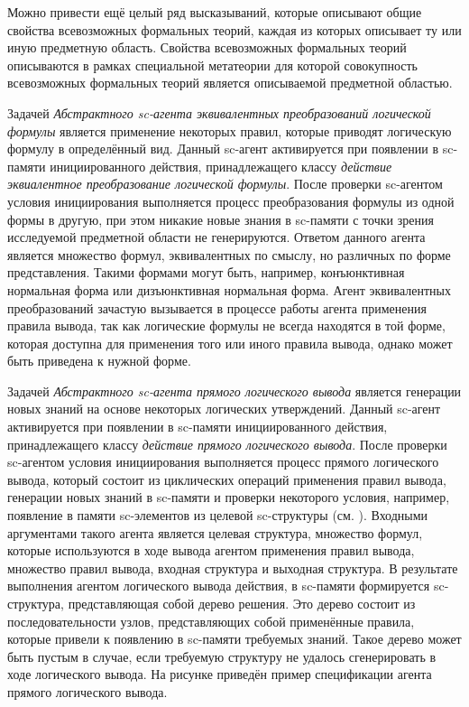 Можно привести ещё целый ряд высказываний, которые описывают общие свойства всевозможных формальных теорий, каждая из которых описывает ту или иную предметную область. Свойства всевозможных формальных теорий описываются в рамках специальной метатеории для которой совокупность всевозможных формальных теорий является описываемой предметной областью.

Задачей \textit{Абстрактного sc-агента эквивалентных преобразований логической формулы} является применение некоторых правил, которые приводят логическую формулу в определённый вид. Данный sc-агент активируется при появлении в sc-памяти инициированного действия, принадлежащего классу \textit{действие эквиалентное преобразование логической формулы}. После проверки sc-агентом условия инициирования выполняется процесс преобразования формулы из одной формы в другую, при этом никакие новые знания в sc-памяти с точки зрения исследуемой предметной области не генерируются. Ответом данного агента является множество формул, эквивалентных по смыслу, но различных по форме представления. Такими формами могут быть, например, конъюнктивная нормальная форма или дизъюнктивная нормальная форма. Агент эквивалентных преобразований зачастую вызывается в процессе работы агента применения правила вывода, так как логические формулы не всегда находятся в той форме, которая доступна для применения того или иного правила вывода, однако может быть приведена к нужной форме.

Задачей \textit{Абстрактного sc-агента прямого логического вывода} является генерации новых знаний на основе некоторых логических утверждений. Данный sc-агент активируется при появлении в sc-памяти инициированного действия, принадлежащего классу \textit{действие прямого логического вывода}. После проверки sc-агентом условия инициирования выполняется процесс прямого логического вывода, который состоит из циклических операций применения правил вывода, генерации новых знаний в sc-памяти и проверки некоторого условия, например, появление в памяти sc-элементов из целевой sc-структуры (см. \textit{}). Входными аргументами такого агента является целевая структура, множество формул, которые используются в ходе вывода агентом применения правил вывода, множество правил вывода, входная структура и выходная структура. В результате выполнения агентом логического вывода действия, в sc-памяти формируется sc-структура, представляющая собой дерево решения. Это дерево состоит из последовательности узлов, представляющих собой применённые правила, которые привели к появлению в sc-памяти требуемых знаний. Такое дерево может быть пустым в случае, если требуемую структуру не удалось сгенерировать в ходе логического вывода. На рисунке \textit{} приведён пример спецификации агента прямого логического вывода.


